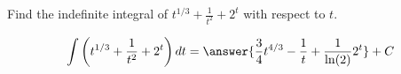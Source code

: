 \documentclass{ximera}
\author{Gregory Hartman \and Matthew Carr\and Nela Lakos}
\begin{document}
\begin{exercise}

Find the indefinite integral of $t^{1/3}+\frac{1}{t^2}+2^t$ with respect to $t$.
\begin{prompt}
  \[
  \int\left( t^{1/3}+\frac{1}{t^2}+2^t\right) dt
  =\answer{\frac{3}{4}t^{4/3}-\frac{1}{t}+\frac{1}{\ln(2)}2^{t}}+C
  \]
\end{prompt}
\end{exercise}
\end{document}

